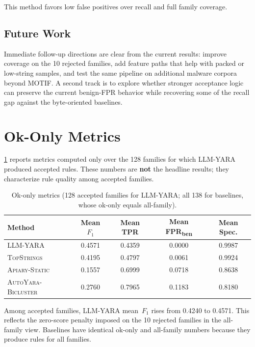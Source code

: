 \documentclass[10pt,twocolumn]{article}
\newcommand{\sysname}{\textsc{LLM-YARA}\xspace}
\newcommand{\topstrings}{\textsc{TopStrings}\xspace}
\newcommand{\apiary}{\textsc{Apiary-Static}\xspace}
\newcommand{\autoyara}{\textsc{AutoYara-Bicluster}\xspace}
\newcommand{\motif}{\textsc{MOTIF}\xspace}
\begin{document}
This method favors low false positives over recall and full family
coverage.

\subsection{Future Work}
Immediate follow-up directions are clear from the current results:
improve coverage on the 10 rejected families, add feature paths that
help with packed or low-string samples, and test the same pipeline on
additional malware corpora beyond \motif.  A second track is to explore
whether stronger acceptance logic can preserve the current benign-FPR
behavior while recovering some of the recall gap against the
byte-oriented baselines.

\clearpage
\onecolumn
\appendix

\section{Ok-Only Metrics}
\label{app:okonly}

\cref{tab:okonly} reports metrics computed only over the 128 families
for which \sysname produced accepted rules.  These numbers are
\textbf{not} the headline results; they characterize rule quality
among accepted families.

\begin{table}[h]
\centering
\caption{Ok-only metrics (128 accepted families for \sysname; all 138
  for baselines, whose ok-only equals all-family).}
\label{tab:okonly}
\small
\begin{tabular}{@{}lcccc@{}}
\toprule
\textbf{Method}
  & \textbf{Mean $F_1$}
  & \textbf{Mean TPR}
  & \textbf{Mean FPR\textsubscript{ben}}
  & \textbf{Mean Spec.} \\
\midrule
\sysname   & 0.4571 & 0.4359 & 0.0000 & 0.9987 \\
\topstrings & 0.4195 & 0.4797 & 0.0061 & 0.9924 \\
\apiary     & 0.1557 & 0.6999 & 0.0718 & 0.8638 \\
\autoyara   & 0.2760 & 0.7965 & 0.1183 & 0.8180 \\
\bottomrule
\end{tabular}
\end{table}

Among accepted families, \sysname mean~$F_1$ rises from 0.4240 to
0.4571.  This reflects the zero-score penalty imposed on the 10
rejected families in the all-family view.  Baselines have identical
ok-only and all-family numbers because they produce rules for all
families.
\end{document}
